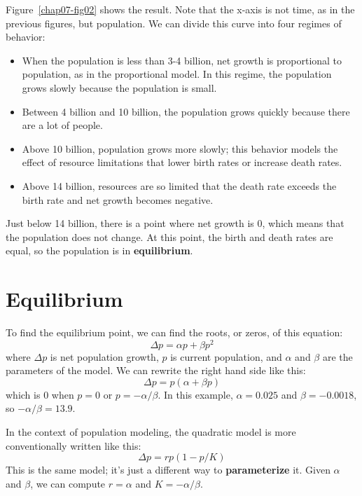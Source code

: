 \documentclass[12pt]{book}
\theoremstyle{exercise}
\begin{document}
Figure~\ref{chap07-fig02} shows the result.  Note that the x-axis is not time, as in the previous figures, but population.  We can divide this curve into four regimes of behavior:

\begin{itemize}

\item When the population is less than 3-4 billion, net growth is proportional to population, as in the proportional model.  In this regime,  the population grows slowly because the population is small.

\item Between 4 billion and 10 billion, the population grows quickly because there are a lot of people.

\item Above 10 billion, population grows more slowly; this behavior models the effect of resource limitations that lower birth rates or increase death rates.

\item Above 14 billion, resources are so limited that the death rate exceeds the birth rate and net growth becomes negative.

\end{itemize}

Just below 14 billion, there is a point where net growth is 0, which means that the population does not change.  At this point, the birth and death rates are equal, so the population is in {\bf equilibrium}.



\section{Equilibrium}
\label{equilibrium}

To find the equilibrium point, we can find the roots, or zeros, of this equation:
%
\[ \Delta p = \alpha p + \beta p^2 \]
%
where $\Delta p$ is net population growth, $p$ is current population, and $\alpha$ and $\beta$ are the parameters of the model.  We can rewrite the right hand side like this:
%
\[ \Delta p = p (\alpha + \beta p) \]
%
which is $0$ when $p=0$ or $p=-\alpha/\beta$.  In this example, $\alpha = 0.025$ and $\beta = -0.0018$, so $-\alpha/\beta = 13.9$.

In the context of population modeling, the quadratic model is more conventionally written like this:
%
\[ \Delta p = r p (1 - p / K) \]
%
This is the same model; it's just a different way to {\bf parameterize} it.  Given $\alpha$ and $\beta$, we can compute $r=\alpha$ and $K=-\alpha/\beta$.
\end{document}
